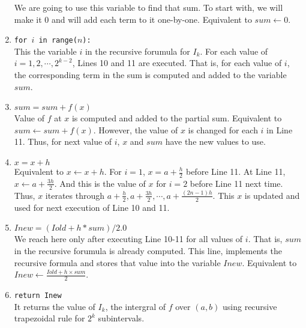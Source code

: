 \begin{commentary}
\begin{enumerate}[label=Line \arabic*]
		We are going to use this variable to find that sum.
		To start with, we will make it $0$ and will add each term to it one-by-one.
		Equivalent to $sum \leftarrow 0$.
	\item \texttt{for $i$ in range($n$):}\\
		This the variable $i$ in the recursive forumula for $I_k$.
		For each value of $i = 1,2,\cdots,2^{k-2}$, Lines 10 and 11 are executed.
		That is, for each value of $i$, the corresponding term in the sum is computed and added to the variable $sum$.
	\item \texttt{$sum = sum + f(x)$}\\
		Value of $f$ at $x$ is computed and added to the partial sum.
		Equivalent to $sum \leftarrow sum + f(x)$.
		However, the value of $x$ is changed for each $i$ in Line 11.
		Thus, for next value of $i$, $x$ and $sum$ have the new values to use.
	\item \texttt{$x = x + h$}\\
		Equivalent to $x \leftarrow x+h$.
		For $i=1$, $x = a + \frac{h}{2}$ before Line 11.
		At Line 11, $x \leftarrow a+\frac{3h}{2}$.
		And this is the value of $x$ for $i = 2$ before Line 11 next time.
		Thus, $x$ iterates through $a+\frac{h}{2}, a+\frac{3h}{2}, \cdots, a+\frac{(2n-1)h}{2}$.
		This $x$ is updated and used for next execution of Line 10 and 11.
	\item \texttt{$Inew = (Iold + h * sum ) / 2.0$}\\
		We reach here only after executing Line 10-11 for all values of $i$.
		That is, $sum$ in the recursive forumula is already computed.
		This line, implements the recursive formula and stores that value into the variable $Inew$.
		Equivalent to $Inew \leftarrow \frac{Iold + h \times sum}{2}$.
	\item \texttt{return Inew}\\
		It returns the value of $I_k$, the intergral of $f$ over $(a,b)$ using recursive trapezoidal rule for $2^k$ subintervals.
\end{enumerate}
\end{commentary}
